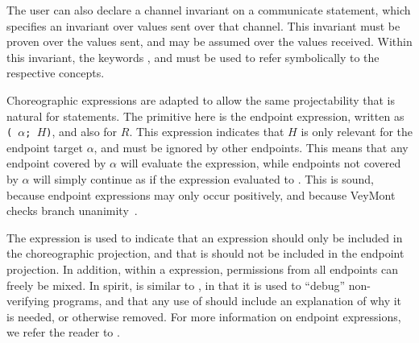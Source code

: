 The user can also declare a channel invariant on a communicate statement, which specifies an invariant over values sent over that channel. This invariant must be proven over the values sent, and may be assumed over the values received. Within this invariant, the keywords \kwsender{}, \kwreceiver{} and \kwmsg{} must be used to refer symbolically to the respective concepts.

Choreographic expressions are adapted to allow the same projectability that is natural for statements. The primitive here is the endpoint expression, written as \texttt{(\kwepexpr{} $\alpha$; $H$)}, and also for $R$. This expression indicates that $H$ is only relevant for the endpoint target $\alpha$, and must be ignored by other endpoints. This means that any endpoint covered by $\alpha$ will evaluate the expression, while endpoints not covered by $\alpha$ will simply continue as if the expression evaluated to \kwtrue{}. This is sound, because endpoint expressions may only occur positively, and because VeyMont checks branch unanimity~\cite{VandenBos2023}.

The \kwchor{} expression is used to indicate that an expression should only be included in the choreographic projection, and that is should not be included in the endpoint projection. In addition, within a \kwchor{} expression, permissions from all endpoints can freely be mixed. In spirit, \kwchor{} is similar to \kwassume{}, in that it is used to ``debug'' non-verifying programs, and that any use of \kwchor{} should include an explanation of why it is needed, or otherwise removed. For more information on endpoint expressions, we refer the reader to \cite{Rubbens2024}.